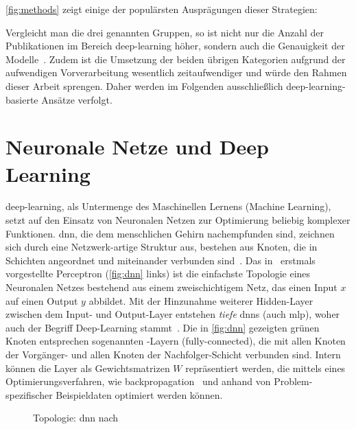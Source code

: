 \autoref{fig:methods} zeigt einige der populärsten Ausprägungen dieser Strategien:

Vergleicht man die drei genannten Gruppen, so ist nicht nur die Anzahl der Publikationen im Bereich \gls{deep-learning} höher, sondern auch die Genauigkeit der Modelle~\cite{Rahmad18}.
Zudem ist die Umsetzung der beiden übrigen Kategorien aufgrund der aufwendigen Vorverarbeitung wesentlich zeitaufwendiger und würde den Rahmen dieser Arbeit sprengen.
Daher werden im Folgenden ausschließlich \gls{deep-learning}-basierte Ansätze verfolgt.


\section{Neuronale Netze und Deep Learning}
\label{sec:deep-learning}

\gls{deep-learning}, als Untermenge des Maschinellen Lernens (Machine Learning), setzt auf den Einsatz von Neuronalen Netzen zur Optimierung beliebig komplexer Funktionen.
\gls{dnn}, die dem menschlichen Gehirn nachempfunden sind, zeichnen sich durch eine Netzwerk-artige Struktur aus, bestehen aus Knoten, die in Schichten angeordnet und miteinander verbunden sind~\cite{Burkov19}.
Das in~\cite{rosenblatt58} erstmals vorgestellte Perceptron (\autoref{fig:dnn} links) ist die einfachste Topologie eines Neuronalen Netzes bestehend aus einem zweischichtigem Netz, das einen Input $x$ auf einen Output $y$ abbildet.
Mit der Hinzunahme weiterer \sog Hidden-Layer zwischen dem Input- und Output-Layer entstehen \emph{tiefe} \glspl{dnn} (auch \gls{mlp}), woher auch der Begriff Deep-Learning stammt~\cite{Burkov19}.
Die in \autoref{fig:dnn} gezeigten grünen Knoten entsprechen sogenannten \fc-Layern (fully-connected), die mit allen Knoten der Vorgänger- und allen Knoten der Nachfolger-Schicht verbunden sind.
Intern können die Layer als Gewichtsmatrizen $W$ repräsentiert werden, die mittels eines Optimierungsverfahren, wie \gls{backpropagation}~\cite{rumelhart86} und anhand von Problem-spezifischer Beispieldaten optimiert werden können.

\begin{figure}
    \centering
    \caption{Topologie: \gls{dnn} nach~\cite{Veen17}}
    \label{fig:dnn}
\end{figure}




